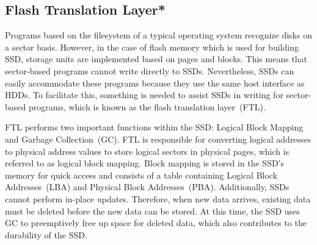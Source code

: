 \subsection{Flash Translation Layer*}\label{ss:ftl}

\begin{comment}
Programs based on the filesystem of a typical operating system recognize disks on a sector basis.
However, in the case of SSDs, storage units are implemented based on pages and blocks.
This means that sector-based programs cannot write directly to SSDs.
Nevertheless, SSDs can easily accommodate these programs because they use the same host interface as HDDs.
To facilitate this, something is needed to assist SSDs in writing for sector-based programs, which is known as the Flash Translation Layer (FTL).

FTL performs two important functions within the SSD: Logical Block Mapping and Garbage Collection (GC).
FTL is responsible for converting logical addresses to physical address values to store logical sectors in physical pages, which is referred to as logical block mapping.
Block mapping is stored in the SSD's memory for quick access and consists of a table containing Logical Block Addresses (LBA) and Physical Block Addresses (PBA).
Additionally, SSDs cannot perform in-place updates.
Therefore, when new data arrives, existing data must be deleted before the new data can be stored.
At this time, the SSD uses GC to preemptively free up space for deleted data, which also contributes to the durability of the SSD.

In this study, we copy and store information from the SSD.
However, accessing the SSD's FTL from the outside is not feasible due to reasons such as security and complexity.
\end{comment}

Programs based on the filesystem of a typical operating system recognize disks on a sector basis.
However, in the case of flash memory which is used for building SSD, storage units are implemented based on pages and blocks.
This means that sector-based programs cannot write directly to SSDs.
Nevertheless, SSDs can easily accommodate these programs because they use the same host interface as HDDs.
To facilitate this, something is needed to assist SSDs in writing for sector-based programs, which is known as the flash translation layer~(FTL).

FTL performs two important functions within the SSD: Logical Block Mapping and Garbage Collection~(GC).
FTL is responsible for converting logical addresses to physical address values to store logical sectors in physical pages, which is referred to as logical block mapping.
Block mapping is stored in the SSD's memory for quick access and consists of a table containing Logical Block Addresses~(LBA) and Physical Block Addresses~(PBA).
Additionally, SSDs cannot perform in-place updates.
Therefore, when new data arrives, existing data must be deleted before the new data can be stored.
At this time, the SSD uses GC to preemptively free up space for deleted data, which also contributes to the durability of the SSD.

